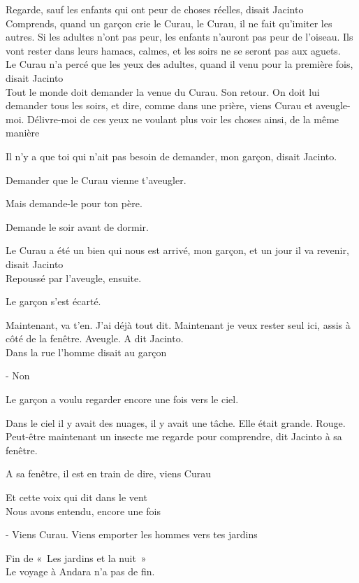 Regarde, sauf les enfants qui ont peur de choses réelles, disait Jacinto\\

Comprends, quand un garçon crie le Curau, le Curau, il ne fait qu'imiter
les autres. Si les adultes n'ont pas peur, les enfants n'auront pas peur
de l'oiseau. Ils vont rester dans leurs hamacs, calmes, et les soirs ne
se seront pas aux aguets.\\

Le Curau n'a percé que les yeux des adultes, quand il venu pour la
première fois, disait Jacinto\\

Tout le monde doit demander la venue du Curau. Son retour. On doit lui
demander tous les soirs, et dire, comme dans une prière, viens Curau et
aveugle-moi. Délivre-moi de ces yeux ne voulant plus voir les choses
ainsi, de la même manière

Il n'y a que toi qui n'ait pas besoin de demander, mon garçon, disait
Jacinto.

Demander que le Curau vienne t'aveugler.

Mais demande-le pour ton père.

Demande le soir avant de dormir.

Le Curau a été un bien qui nous est arrivé, mon garçon, et un jour il va
revenir, disait Jacinto\\

Repoussé par l'aveugle, ensuite.

Le garçon s'est écarté.

Maintenant, va t'en. J'ai déjà tout dit. Maintenant je veux rester seul
ici, assis à côté de la fenêtre. Aveugle. A dit Jacinto.\\

Dans la rue l'homme disait au garçon

- Non

Le garçon a voulu regarder encore une fois vers le ciel.

Dans le ciel il y avait des nuages, il y avait une tâche. Elle était
grande. Rouge.\\

Peut-être maintenant un insecte me regarde pour comprendre, dit Jacinto
à sa fenêtre.

A sa fenêtre, il est en train de dire, viens Curau

\pagebreak

Et cette voix qui dit dans le vent\\

Nous avons entendu, encore une fois

- Viens Curau. Viens emporter les hommes vers tes jardins

\vfill
Fin de «~Les jardins et la nuit~»\\

Le voyage à Andara n'a pas de fin.
